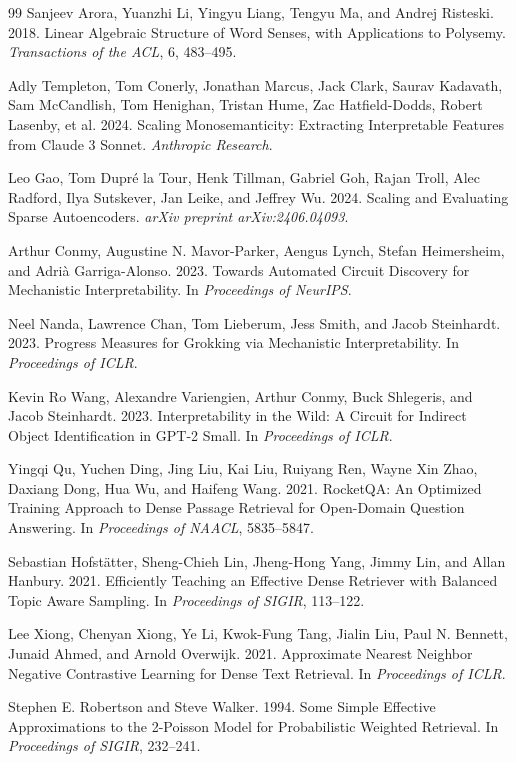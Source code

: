 \documentclass[sigconf]{acmart}
\begin{document}
\begin{thebibliography}{99}
Sanjeev Arora, Yuanzhi Li, Yingyu Liang, Tengyu Ma, and Andrej Risteski. 2018. Linear Algebraic Structure of Word Senses, with Applications to Polysemy. \textit{Transactions of the ACL}, 6, 483--495.

Adly Templeton, Tom Conerly, Jonathan Marcus, Jack Clark, Saurav Kadavath, Sam McCandlish, Tom Henighan, Tristan Hume, Zac Hatfield-Dodds, Robert Lasenby, et al. 2024. Scaling Monosemanticity: Extracting Interpretable Features from Claude 3 Sonnet. \textit{Anthropic Research}.

Leo Gao, Tom Dupr\'e la Tour, Henk Tillman, Gabriel Goh, Rajan Troll, Alec Radford, Ilya Sutskever, Jan Leike, and Jeffrey Wu. 2024. Scaling and Evaluating Sparse Autoencoders. \textit{arXiv preprint arXiv:2406.04093}.

Arthur Conmy, Augustine N. Mavor-Parker, Aengus Lynch, Stefan Heimersheim, and Adri\`a Garriga-Alonso. 2023. Towards Automated Circuit Discovery for Mechanistic Interpretability. In \textit{Proceedings of NeurIPS}.

Neel Nanda, Lawrence Chan, Tom Lieberum, Jess Smith, and Jacob Steinhardt. 2023. Progress Measures for Grokking via Mechanistic Interpretability. In \textit{Proceedings of ICLR}.

Kevin Ro Wang, Alexandre Variengien, Arthur Conmy, Buck Shlegeris, and Jacob Steinhardt. 2023. Interpretability in the Wild: A Circuit for Indirect Object Identification in GPT-2 Small. In \textit{Proceedings of ICLR}.

Yingqi Qu, Yuchen Ding, Jing Liu, Kai Liu, Ruiyang Ren, Wayne Xin Zhao, Daxiang Dong, Hua Wu, and Haifeng Wang. 2021. RocketQA: An Optimized Training Approach to Dense Passage Retrieval for Open-Domain Question Answering. In \textit{Proceedings of NAACL}, 5835--5847.

Sebastian Hofst\"atter, Sheng-Chieh Lin, Jheng-Hong Yang, Jimmy Lin, and Allan Hanbury. 2021. Efficiently Teaching an Effective Dense Retriever with Balanced Topic Aware Sampling. In \textit{Proceedings of SIGIR}, 113--122.

Lee Xiong, Chenyan Xiong, Ye Li, Kwok-Fung Tang, Jialin Liu, Paul N. Bennett, Junaid Ahmed, and Arnold Overwijk. 2021. Approximate Nearest Neighbor Negative Contrastive Learning for Dense Text Retrieval. In \textit{Proceedings of ICLR}.

Stephen E. Robertson and Steve Walker. 1994. Some Simple Effective Approximations to the 2-Poisson Model for Probabilistic Weighted Retrieval. In \textit{Proceedings of SIGIR}, 232--241.


\end{thebibliography}
\end{document}
